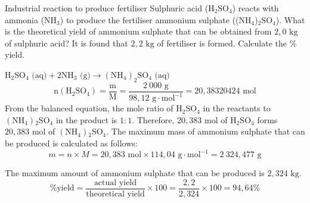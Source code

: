  \par \label{m38712*secfhsst!!!underscore!!!id2067}
      \noindent 
      \begin{wex}{Industrial reaction to produce fertiliser }
{
\label{m38712*probfhsst!!!underscore!!!id2068}
      \label{m38712*id284606}Sulphuric acid ($\text{H}{}_{2}\text{SO}{}_{4}$) reacts with ammonia ($\text{NH}{}_{3}$) to produce the fertiliser ammonium sulphate (($\text{NH}{}_{4}$)${}_{2}\text{SO}{}_{4}$). What is the theoretical yield of ammonium sulphate that can be obtained from $2,0 \text{ kg}$ of sulphuric acid? It is found that $2,2 \text{ kg}$ of fertiliser is formed. Calculate the $\%$ yield. }
{
      \label{m38712*id284813}\nopagebreak\noindent{}
\label{m38712*id284690}${\text{H}}_{2}{\text{SO}}_{4} \text{ (aq)} + 2{\text{NH}}_{3}\text{ (g)} \to {({\text{NH}}_{4})}_{2}{\text{SO}}_{4}  \text{ (aq)}$
    \begin{equation*}
    \text{n} ({\text{H}}_{2}{\text{SO}}_{4}) = \frac{\text{m}}{\text{M}} = \frac{2~000 \text{ g}}{98,12 \text{ g} \cdot {\text{mol}}^{-1}} = 20,38320424\text{ mol}
      \end{equation*}
      \label{m38712*id285156}From the balanced equation, the mole ratio of $\text{H}{}_{2}\text{SO}{}_{4}$ in the reactants to $(\text{NH}{}_{4}){}_{2}\text{SO}{}_{4}$ in the product is $1:1$. Therefore, $20,383 \text{ mol}$ of $\text{H}{}_{2}\text{SO}{}_{4}$ forms $20,383 \text{ mol}$ of $(\text{NH}{}_{4}){}_{2}\text{SO}{}_{4}$. 
      \label{m38712*id285290}The maximum mass of ammonium sulphate that can be produced is calculated as follows:
      \label{m38712*id285296}\nopagebreak\noindent{}
    \begin{equation*}
    m=n \times M = 20,383 \text{ mol} \times 114,04 \text{ g} \cdot {\text{mol}}^{-1} = 2~324,477 \text{ g}
      \end{equation*}
      
      \label{m38712*id285362}The maximum amount of ammonium sulphate that can be produced is $2,324 \text{ kg}$.
\begin{equation*}
\text{\% yield} = \frac{\text{actual yield}}{\text{theoretical yield}} \times 100 = \frac{2,2}{2,324} \times 100 = 94,64 \%\end{equation*}
}
    \end{wex}
\label{m38717*secfhsst!!!underscore!!!id695}
